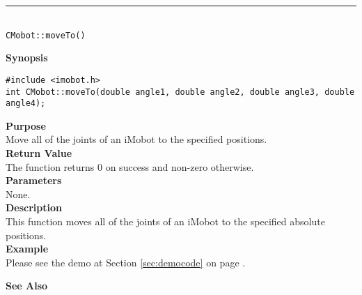 \noindent
\vspace{5pt}
\rule{4.5in}{0.015in}\\
\noindent
{\LARGE \texttt{CMobot::moveTo()}}\\
{}

\noindent
{\bf Synopsis}\\
\begin{verbatim}
#include <imobot.h>
int CMobot::moveTo(double angle1, double angle2, double angle3, double angle4);
\end{verbatim}

\noindent
{\bf Purpose}\\
Move all of the joints of an iMobot to the specified positions.\\

\noindent
{\bf Return Value}\\
The function returns 0 on success and non-zero otherwise.\\

\noindent
{\bf Parameters}\\
None.\\

\noindent
{\bf Description}\\
This function moves all of the joints of an iMobot to the specified absolute positions. \\

\noindent
{\bf Example}\\
Please see the demo at Section \ref{sec:democode} on page \pageref{sec:democode}.\\
\noindent

\noindent
{\bf See Also}\\

